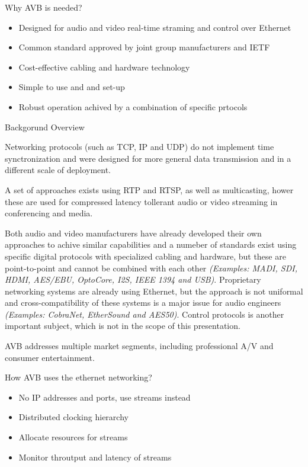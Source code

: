 { Why AVB is needed? }

\begin{itemize}
	\item Designed for audio and video real-time straming and control over Ethernet
	\item Common standard approved by joint group manufacturers and IETF
	\item Cost-effective cabling and hardware technology
	\item Simple to use and and set-up
	\item Robust operation achived by a combination of specific prtocols
\end{itemize}

{ Backgorund Overview }

Networking protocols (such as TCP, IP and UDP) do not implement time synctronization and
were designed for more general data transmission and in a different scale of deployment.

A set of approaches exists using RTP and RTSP, as well as multicasting, hower these
are used for compressed latency tollerant audio or video streaming in conferencing and media.

Both audio and video manufacturers have already developed their own approaches to achive
similar capabilities and a numeber of standards exist using specific digital protocols with
specialized cabling and hardware, but these are point-to-point and cannot be combined with each other
\emph{(Examples: MADI, SDI, HDMI, AES/EBU, OptoCore, I2S, IEEE 1394 and USB)}.
Proprietary networking systems are already using Ethernet, but the approach is not uniformal
and cross-compatibility of these systems is a major issue for audio engineers
\emph{(Examples: CobraNet, EtherSound and AES50)}.
Control protocols is another important subject, which is not in the scope of this presentation.

{ AVB addresses multiple market segments, including professional A/V and consumer entertainment. }

How AVB uses the ethernet networking?

\begin{itemize}
	\item No IP addresses and ports, use streams instead
	\item Distributed clocking hierarchy
	\item Allocate resources for streams
	\item Monitor throutput and latency of streams
\end{itemize}

